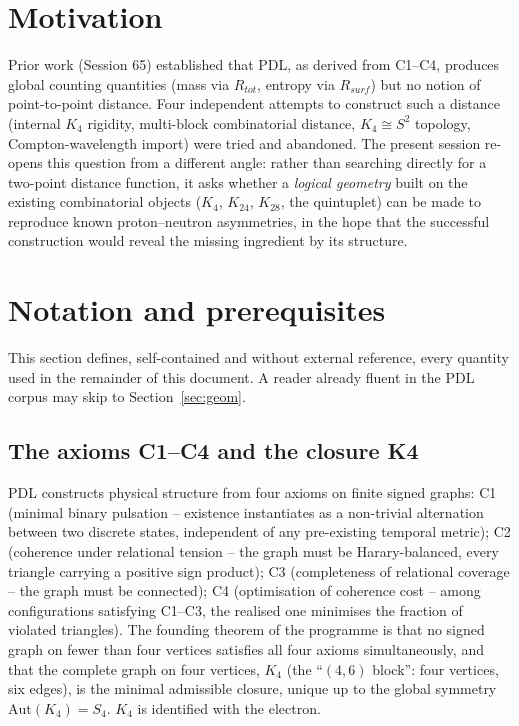 \documentclass[11pt]{article}
\def\texorpdfstring#1#2{#2}%
\begin{document}
\section{Motivation}
\label{sec:motivation}

Prior work (Session 65) established that PDL, as derived from C1--C4, produces global counting quantities (mass via $R_{tot}$, entropy via $R_{surf}$) but no notion of point-to-point distance. Four independent attempts to construct such a distance (internal $K_4$ rigidity, multi-block combinatorial distance, $K_4\cong S^2$ topology, Compton-wavelength import) were tried and abandoned. The present session re-opens this question from a different angle: rather than searching directly for a two-point distance function, it asks whether a \emph{logical geometry} built on the existing combinatorial objects ($K_4$, $K_{24}$, $K_{28}$, the quintuplet) can be made to reproduce known proton--neutron asymmetries, in the hope that the successful construction would reveal the missing ingredient by its structure.

\section{Notation and prerequisites}
\label{sec:prereq}

This section defines, self-contained and without external reference, every quantity used in the remainder of this document. A reader already fluent in the PDL corpus may skip to Section~\ref{sec:geom}.

\subsection{The axioms C1--C4 and the closure \texorpdfstring{$K_4$}{K4}}
PDL constructs physical structure from four axioms on finite signed graphs: C1 (minimal binary pulsation -- existence instantiates as a non-trivial alternation between two discrete states, independent of any pre-existing temporal metric); C2 (coherence under relational tension -- the graph must be Harary-balanced, every triangle carrying a positive sign product); C3 (completeness of relational coverage -- the graph must be connected); C4 (optimisation of coherence cost -- among configurations satisfying C1--C3, the realised one minimises the fraction of violated triangles). The founding theorem of the programme is that no signed graph on fewer than four vertices satisfies all four axioms simultaneously, and that the complete graph on four vertices, $K_4$ (the ``$(4,6)$ block'': four vertices, six edges), is the minimal admissible closure, unique up to the global symmetry $\mathrm{Aut}(K_4)=S_4$. $K_4$ is identified with the electron.
\end{document}
